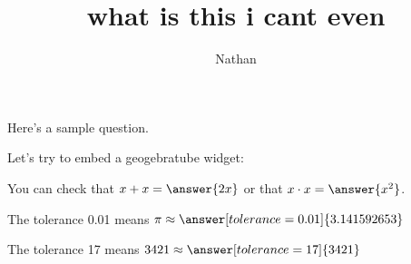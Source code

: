 \documentclass{ximera}
\title{what is this i cant even}
\author{Nathan}
\begin{document}
\maketitle

Here's a sample question.

\begin{problem}
\begin{multipleChoice}
\end{multipleChoice}
\end{problem}

Let's try to embed a geogebratube widget:


\begin{problem}
   You can check that $x + x = \answer{2x}$ or that $x \cdot x = \answer{x^2}$.
\end{problem}

\begin{problem}
   The tolerance 0.01 means $\pi \approx \answer[tolerance=0.01]{3.141592653}$
\end{problem}

\begin{problem}
   The tolerance 17 means $3421 \approx \answer[tolerance=17]{3421}$
\end{problem}
\end{document}
